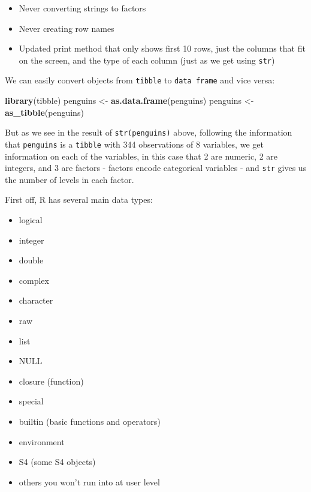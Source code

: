 \documentclass[
]{book}
\newenvironment{Shaded}{\begin{snugshade}}{\end{snugshade}}
\newcommand{\KeywordTok}[1]{\textcolor[rgb]{0.13,0.29,0.53}{\textbf{#1}}}
\newcommand{\NormalTok}[1]{#1}
\newcommand{\StringTok}[1]{\textcolor[rgb]{0.31,0.60,0.02}{#1}}
\providecommand{\tightlist}{%
  \setlength{\itemsep}{0pt}\setlength{\parskip}{0pt}}
\begin{document}
\begin{itemize}
\tightlist
\item
  Never converting strings to factors
\item
  Never creating row names
\item
  Updated print method that only shows first 10 rows, just the columns that fit on the screen, and the type of each column (just as we get using \texttt{str})
\end{itemize}

We can easily convert objects from \texttt{tibble} to \texttt{data\ frame} and vice versa:

\begin{Shaded}
\begin{Highlighting}[]
\KeywordTok{library}\NormalTok{(tibble)}
\NormalTok{penguins <-}\StringTok{ }\KeywordTok{as.data.frame}\NormalTok{(penguins)}
\NormalTok{penguins <-}\StringTok{ }\KeywordTok{as_tibble}\NormalTok{(penguins)}
\end{Highlighting}
\end{Shaded}

But as we see in the result of \texttt{str(penguins)} above, following the information that \texttt{penguins} is a \texttt{tibble} with 344 observations of 8 variables, we get information on each of the variables, in this case that 2 are numeric, 2 are integers, and 3 are factors - factors encode categorical variables - and \texttt{str} gives us the number of levels in each factor.

First off, R has several main data types:

\begin{itemize}
\tightlist
\item
  logical
\item
  integer
\item
  double
\item
  complex
\item
  character
\item
  raw
\item
  list
\item
  NULL
\item
  closure (function)
\item
  special
\item
  builtin (basic functions and operators)
\item
  environment
\item
  S4 (some S4 objects)
\item
  others you won't run into at user level
\end{itemize}
\end{document}
